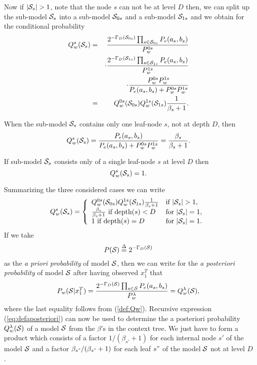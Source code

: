 \documentclass[10pt,conference]{IEEEtran}
\newcommand{\xT}{x^{T}_{1}}
\newcommand{\cS}{{\cal{S}}}
\newcommand{\define}{\stackrel{\Delta}{=}}
\newcommand{\GD}{{\Gamma_{D}}}
\begin{document}
Now if $|\cS_s|>1$, note that the node $s$ can not be at level $D$ then, we can split up the sub-model $\cS_{s}$ into a sub-model $\cS_{0s}$ and a sub-model $\cS_{1s}$ and we obtain for the conditional probability
\begin{eqnarray}
Q_{w}^{s}(\cS_s) &=&    \frac{ 2^{-\GD(\cS_{0s})}
\prod_{s\in\cS_{0s}}
       P_e(a_s,b_s) } { P_{w}^{0s}} \nonumber \\
&&\cdot\frac{ 2^{-\GD(\cS_{1s})} \prod_{s\in\cS_{1s}}
       P_e(a_s,b_s) } { P_{w}^{1s}} \nonumber \\
&&\cdot\frac{ P_{w}^{0s} P_{w}^{1s} }
       { P_e(a_s,b_s)+P_{w}^{0s}P_{w}^{1s} } \nonumber \\
&=&    Q_{w}^{0s}(\cS_{0s})Q_{w}^{1s}(\cS_{1s})\frac{1}{\beta_{s}+1}.
\end{eqnarray}

When the sub-model $\cS_{s}$ contains only one leaf-node $s$, not at depth $D$, then
\begin{equation}
Q_{w}^{s}(\cS_s)
= \frac{ P_e(a_s,b_s) }{ P_e(a_s,b_s) + P_{w}^{0s}P_{w}^{1s} }
= \frac{\beta_{s}}{\beta_{s}+1}.
\end{equation}

If sub-model $\cS_{s}$ consists only of a single leaf-node $s$ at level $D$ then
\begin{equation}
Q_{w}^{s}(\cS_s) = 1.
\end{equation}

Summarizing the three considered cases we can write
\begin{equation}
\label{eq:defaposteriori}
Q_{w}^{s}(\cS_{s})  =
\left\{\begin{array}{ll}
                Q_{w}^{0s}(\cS_{0s}) Q_{w}^{1s}(\cS_{1s}) \frac{1}{\beta_{s}+1}
                &\mbox{if $|\cS_s|>1$}, \\
                \frac{\beta_{s}}{\beta_{s}+1} \mbox{ if depth$(s)<D$}
                &\mbox{for $|\cS_s|=1$}, \\
                1 \mbox{ if depth$(s)=D$}
                &\mbox{for $|\cS_s|=1$}.
       \end{array} \right.
\end{equation}
If we take
\begin{equation}
P(\cS) \define  2^{-\GD(\cS)}
\end{equation}
as the {\em a priori probability} of model $\cS$, then we can write for the {\em a posteriori probability} of model $\cS$ after having observed $\xT$ that
\begin{equation}
P_{w}(\cS|\xT) = \frac{2^{-\GD(\cS)} \prod_{s\in\cS} P_e(a_s,b_s)
} { P_{w}^{\lambda} } = Q_{w}^{\lambda}(\cS),
\end{equation}
where the last equality follows from (\ref{def:Qw}).
Recursive expression (\ref{eq:defaposteriori}) can now be used to determine the a posteriori probability $Q_{w}^{\lambda}(\cS)$ of a model $\cS$ from the $\beta$'s in the context tree.
We just have to form a product which consists of a factor $1/(\beta_{s'}+1)$ for each internal node $s'$ of the model $\cS$ and a factor $\beta_{s"}/(\beta_{s"}+1)$ for each leaf $s"$ of the model $\cS$ not at level $D$.
\end{document}
